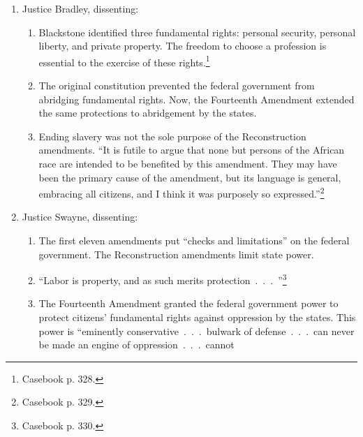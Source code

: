 \begin{enumerate}
\begin{enumerate}
        life.''\footnote{Casebook p. 326.} By the majority's rationale, 
        ``there is no monopoly, in the most odious form, which may not be 
        upheld.''\footnote{Casebook p. 327.}
        \item The Fourteenth Amendment \emph{does} protect U.S. citizens 
        against violations by state legislatures of ``common 
        rights'' (i.e., inalienable natural rights, like the right to property 
        and to pursue happiness)\footnote{Casebook p. 327.}
    \end{enumerate}
    \item Justice Bradley, dissenting:
    \begin{enumerate}
        \item Blackstone identified three fundamental rights: personal 
        security, personal liberty, and private property. The freedom to choose a 
        profession is essential to the exercise of these 
        rights.\footnote{Casebook p. 328.}
        \item The original constitution prevented the federal government from 
        abridging fundamental rights. Now, the Fourteenth Amendment extended 
        the same protections to abridgement by the states.
        \item Ending slavery was not the sole purpose of the Reconstruction 
        amendments. ``It is futile to argue that none but persons of the 
        African race are intended to be benefited by this amendment. They may 
        have been the primary cause of the amendment, but its language is 
        general, embracing all citizens, and I think it was purposely so 
        expressed.''\footnote{Casebook p. 329.}
    \end{enumerate}
    \item Justice Swayne, dissenting:
    \begin{enumerate}
        \item The first eleven amendments put ``checks and limitations'' on 
        the federal government. The Reconstruction amendments limit state 
        power.
        \item ``Labor is property, and as such merits 
        protection~.~.~.~''\footnote{Casebook p. 330.}
        \item The Fourteenth Amendment granted the federal government power to 
        protect citizens' fundamental rights against oppression by the states. 
        This power is ``eminently conservative~.~.~.~bulwark of 
        defense~.~.~.~can never be made an engine of oppression~.~.~.~cannot 

\end{enumerate}
\end{enumerate}
